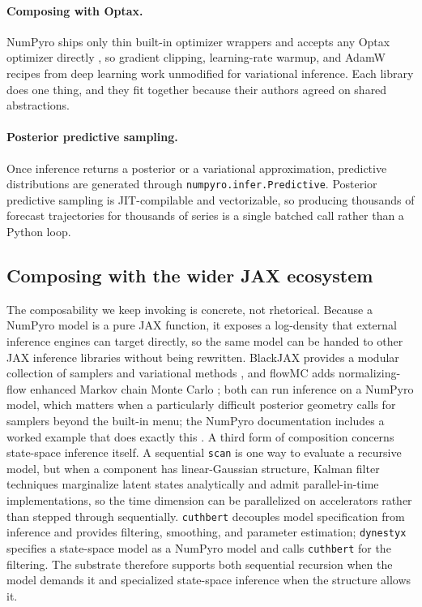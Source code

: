 \documentclass[11pt,3p,review,authoryear]{elsarticle}
\begin{document}
\paragraph{Composing with Optax.}
NumPyro ships only thin built-in optimizer wrappers and accepts any Optax optimizer directly \citep{optax2020github}, so gradient clipping, learning-rate warmup, and AdamW recipes from deep learning work unmodified for variational inference. Each library does one thing, and they fit together because their authors agreed on shared abstractions.

\paragraph{Posterior predictive sampling.}
Once inference returns a posterior or a variational approximation, predictive distributions are generated through \texttt{numpyro.infer.Predictive}. Posterior predictive sampling is JIT-compilable and vectorizable, so producing thousands of forecast trajectories for thousands of series is a single batched call rather than a Python loop.

\subsection{Composing with the wider JAX ecosystem}

The composability we keep invoking is concrete, not rhetorical. Because a NumPyro model is a pure JAX function, it exposes a log-density that external inference engines can target directly, so the same model can be handed to other JAX inference libraries without being rewritten. BlackJAX provides a modular collection of samplers and variational methods \citep{cabezas2024blackjax}, and flowMC adds normalizing-flow enhanced Markov chain Monte Carlo \citep{wong2023flowmc}; both can run inference on a NumPyro model, which matters when a particularly difficult posterior geometry calls for samplers beyond the built-in menu; the NumPyro documentation includes a worked example that does exactly this \citep{numpyro_other_samplers}. A third form of composition concerns state-space inference itself. A sequential \texttt{scan} is one way to evaluate a recursive model, but when a component has linear-Gaussian structure, Kalman filter techniques marginalize latent states analytically and admit parallel-in-time implementations, so the time dimension can be parallelized on accelerators rather than stepped through sequentially. \texttt{cuthbert} \citep{cuthbert} decouples model specification from inference and provides filtering, smoothing, and parameter estimation; \texttt{dynestyx} \citep{dynestyx} specifies a state-space model as a NumPyro model and calls \texttt{cuthbert} for the filtering. The substrate therefore supports both sequential recursion when the model demands it and specialized state-space inference when the structure allows it.
\end{document}
